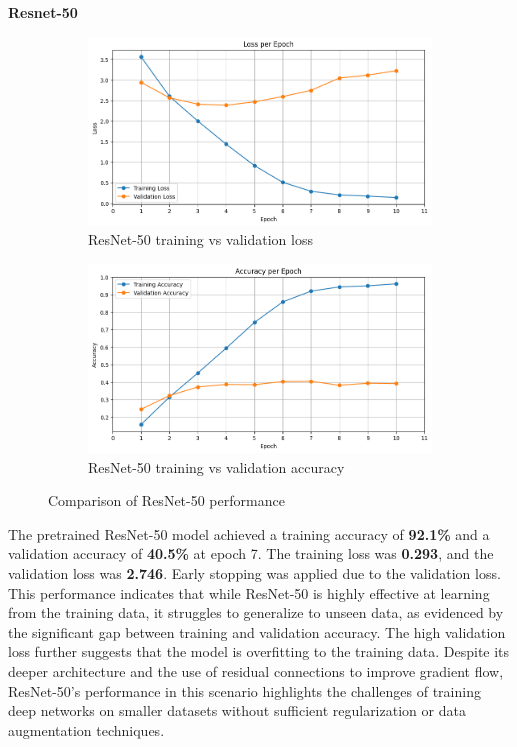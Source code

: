 \documentclass[12pt]{article}
\begin{document}
\textbf{Resnet-50}


\begin{figure}[ht]
    \centering
    \begin{subfigure}{0.45\linewidth}
        \centering
        \includegraphics[width=\linewidth]{t4_res50_loss.png}
        \caption{ResNet-50 training vs validation loss}
        \label{fig:t4_res50_loss}
    \end{subfigure}
    \hfill
    \begin{subfigure}{0.45\linewidth}
        \centering
        \includegraphics[width=\linewidth]{t4_res50_acc.png}
        \caption{ResNet-50 training vs validation accuracy}
        \label{fig:t4_res50_acc}
    \end{subfigure}
    \caption{Comparison of ResNet-50 performance}
    \label{fig:t4_res50_performance}
\end{figure}

The pretrained ResNet-50 model achieved a training accuracy of \textbf{92.1\%} and a validation accuracy of \textbf{40.5\%} at epoch 7. The training loss was \textbf{0.293}, and the validation loss was \textbf{2.746}. Early stopping was applied due to the validation loss. This performance indicates that while ResNet-50 is highly effective at learning from the training data, it struggles to generalize to unseen data, as evidenced by the significant gap between training and validation accuracy. The high validation loss further suggests that the model is overfitting to the training data. Despite its deeper architecture and the use of residual connections to improve gradient flow, ResNet-50's performance in this scenario highlights the challenges of training deep networks on smaller datasets without sufficient regularization or data augmentation techniques.
\end{document}
